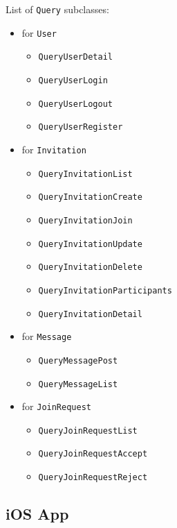 \documentclass[12pt]{scrartcl}
\begin{document}
\newpage
List of \texttt{Query} subclasses:

\begin{itemize}
	\item for \texttt{User}
	\begin{itemize}
		\item \texttt{QueryUserDetail}
		\item \texttt{QueryUserLogin}
		\item \texttt{QueryUserLogout}
		\item \texttt{QueryUserRegister}
	\end{itemize}
	
	\item for \texttt{Invitation}
	\begin{itemize}
		\item \texttt{QueryInvitationList}
		\item \texttt{QueryInvitationCreate}
		\item \texttt{QueryInvitationJoin}
		\item \texttt{QueryInvitationUpdate}
		\item \texttt{QueryInvitationDelete}
		\item \texttt{QueryInvitationParticipants}
		\item \texttt{QueryInvitationDetail}
	\end{itemize}
	
	\item for \texttt{Message}
	\begin{itemize}
		\item \texttt{QueryMessagePost}
		\item \texttt{QueryMessageList}
	\end{itemize}
	
	\item for \texttt{JoinRequest}
	\begin{itemize}
		\item \texttt{QueryJoinRequestList}
		\item \texttt{QueryJoinRequestAccept}
		\item \texttt{QueryJoinRequestReject}
	\end{itemize}
	
\end{itemize}

\newpage
\subsection{iOS App}
\end{document}
